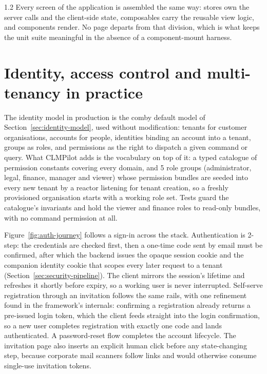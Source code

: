 \begin{spacing}{1.2}
Every screen of the application is assembled the same way: stores own
the server calls and the client-side state, composables carry the
reusable view logic, and components render. No page departs from that
division, which is what keeps the unit suite meaningful in the absence
of a component-mount harness.

\section{Identity, access control and multi-tenancy in practice}
\label{sec:iam-practice}

The identity model in production is the comby default model of
Section~\ref{sec:identity-model}, used without modification: tenants for
customer organisations, accounts for people, identities binding an
account into a tenant, groups as roles, and permissions as the right to
dispatch a given command or query. What CLMPilot adds is the vocabulary
on top of it: a typed catalogue of permission constants covering every
domain, and 5 role groups (administrator, legal, finance, manager and
viewer) whose permission bundles are seeded into every new tenant by a
reactor listening for tenant creation, so a freshly provisioned
organisation starts with a working role set. Tests guard the catalogue's
invariants and hold the viewer and finance roles to read-only bundles,
with no command permission at all.

Figure~\ref{fig:auth-journey} follows a sign-in across the stack.
Authentication is 2-step: the credentials are checked first, then a
one-time code sent by email must be confirmed, after which the backend
issues the opaque session cookie and the companion identity cookie that
scopes every later request to a tenant
(Section~\ref{sec:security-pipeline}). The client mirrors the session's
lifetime and refreshes it shortly before expiry, so a working user is
never interrupted. Self-serve registration through an invitation follows
the same rails, with one refinement found in the framework's internals:
confirming a registration already returns a pre-issued login token,
which the client feeds straight into the login confirmation, so a new
user completes registration with exactly one code and lands
authenticated. A password-reset flow completes the account lifecycle.
The invitation page also inserts an explicit human click before any
state-changing step, because corporate mail scanners follow links and
would otherwise consume single-use invitation tokens.


\end{spacing}
